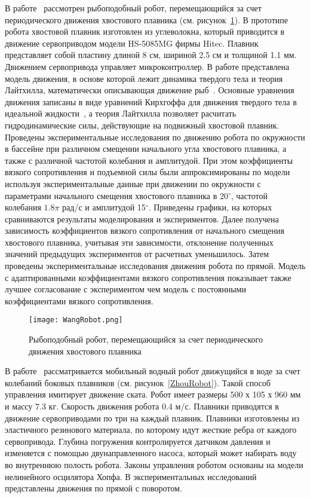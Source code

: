 В работе~\cite{Wang_Tan} рассмотрен рыбоподобный робот, перемещающийся за счет периодического движения хвостового плавника (см. рисунок~\ref{WangRobot}). В прототипе робота хвостовой плавник изготовлен из углеволокна, который приводится в движение сервоприводом модели HS-5085MG фирмы Hitec. Плавник представляет собой пластину длиной 8 см, шириной 2.5 см и толщиной 1.1 мм. Движением сервопривода управляет микроконтроллер. В работе представлена модель движения, в основе которой лежит  динамика твердого тела и теория Лайтхилла, математически описывающая движение рыб~\cite{Lighthill_1970}. Основные уравнения движения записаны в виде уравнений Кирхгоффа для движения твердого тела в идеальной жидкости~\cite{Kirchhoff}, а теория Лайтхилла позволяет расчитать гидродинамические силы, действующие на подвижный хвостовой плавник. Проведены экспериментальные исследования по движению робота по окружности в бассейне при различном смещении начального угла хвостового плавника, а также с различной частотой колебания и амплитудой. При этом коэффициенты вязкого сопротивления и подъемной силы были аппроксимированы по модели используя экспериментальные данные при движении по окружности с параметрами начального смещения хвостового плавника в 20$^\circ$, частотой колебания $1.8\pi$ рад/с и амплитудой 15$^\circ$. Приведены графики, на которых сравниваются результаты моделирования и экспериментов. Далее получена зависимость коэффициентов вязкого сопротивления от начального смещения хвостового плавника, учитывая эти зависимости, отклонение полученных значений предыдущих экспериментов от расчетных уменьшилось. Затем проведены экспериментальные исследования движения робота по прямой. Модель с адаптированными коэффициентами вязкого сопротивления показывает также лучшее согласование с экспериментом чем модель с постоянными коэффициентами вязкого сопротивления.

\begin{figure}[h]
	\centering
	\texttt{[image: WangRobot.png]}%
	\caption{Рыбоподобный робот, перемещающийся за счет периодического движения хвостового плавника}
	\label{WangRobot}
\end{figure}

В работе~\cite{Zhou_2011} рассматривается мобильный водный робот движущийся в воде за счет колебаний боковых плавников (см. рисунок~\ref{ZhouRobot}). Такой способ управления имитирует движение ската. Робот имеет размеры 500 х 105 х 960 мм и массу 7.3 кг. Скорость движения робота 0.4 м/с. Плавники приводятся в движение сервоприводами по три на каждый плавник. Плавники изготовлены из эластичного резинового материала, по которому идут жесткие ребра от каждого сервопривода. Глубина погружения контролируется датчиком давления и изменяется с помощью двунаправленного насоса, который может набирать воду во внутреннюю полость робота. Законы управления роботом основаны на модели нелинейного осцилятора Хопфа. В экспериментальных исследований представлены движения по прямой с поворотом. %

